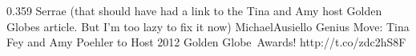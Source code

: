 {0.359}
{\joinNameTweet
{Serrae}
{(that should have had a link to the Tina and Amy host Golden Globes article. But I'm too lazy to fix it now)}}
{\joinNameTweet
{MichaelAusiello}
{Genius Move: Tina Fey and Amy Poehler to Host 2012 Golden Globe Awards! http://t.co/zdc2hS8F}}
%
%
%
%
%
%
%
%
%
%
